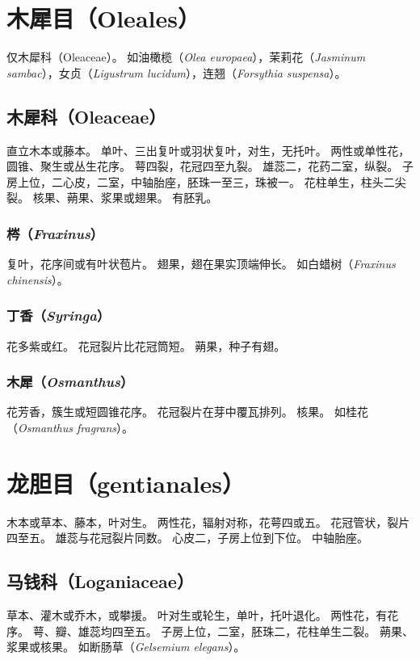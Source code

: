 \documentclass[11pt]{article}
\begin{document}
\begin{sloppypar}
\section{木犀目（Oleales）}
仅木犀科（Oleaceae）。
如油橄榄（\textit{Olea europaea}），茉莉花（\textit{Jasminum sambac}），女贞（\textit{Ligustrum lucidum}），连翘（\textit{Forsythia suspensa}）。

\subsection{木犀科（Oleaceae）}
直立木本或藤本。
单叶、三出复叶或羽状复叶，对生，无托叶。
两性或单性花，圆锥、聚生或丛生花序。
萼四裂，花冠四至九裂。
雄蕊二，花药二室，纵裂。
子房上位，二心皮，二室，中轴胎座，胚珠一至三，珠被一。
花柱单生，柱头二尖裂。
核果、蒴果、浆果或翅果。
有胚乳。

\subsubsection{梣（\textit{Fraxinus}）}
复叶，花序间或有叶状苞片。
翅果，翅在果实顶端伸长。
如白蜡树（\textit{Fraxinus chinensis}）。

\subsubsection{丁香（\textit{Syringa}）}
花多紫或红。
花冠裂片比花冠筒短。
蒴果，种子有翅。

\subsubsection{木犀（\textit{Osmanthus}）}
花芳香，簇生或短圆锥花序。
花冠裂片在芽中覆瓦排列。
核果。
如桂花（\textit{Osmanthus fragrans}）。

\section{龙胆目（gentianales）}
木本或草本、藤本，叶对生。
两性花，辐射对称，花萼四或五。
花冠管状，裂片四至五。
雄蕊与花冠裂片同数。
心皮二，子房上位到下位。
中轴胎座。

\subsection{马钱科（Loganiaceae）}
草本、灌木或乔木，或攀援。
叶对生或轮生，单叶，托叶退化。
两性花，有花序。
萼、瓣、雄蕊均四至五。
子房上位，二室，胚珠二，花柱单生二裂。
蒴果、浆果或核果。
如断肠草（\textit{Gelsemium elegans}）。


\end{sloppypar}
\end{document}
